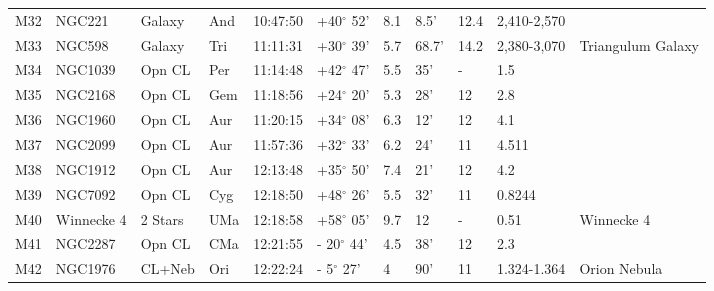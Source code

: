 \documentclass[10pt,twoside,a4paper,english]{article}
\begin{document}
\begin{longtable}{@{}lllllllllll@{}}
M32        & NGC221      & Galaxy     & And       & 10:47:50 & +40$^{\circ}$ 52'  & 8.1       & 8.5'                 & 12.4     & 2,410-2,570         &                                           \\ 
M33        & NGC598      & Galaxy     & Tri       & 11:11:31 & +30$^{\circ}$ 39'  & 5.7       & 68.7'                & 14.2     & 2,380-3,070         & Triangulum Galaxy                         \\ 
M34        & NGC1039     & Opn CL     & Per       & 11:14:48 & +42$^{\circ}$ 47'  & 5.5       & 35'                  & -        & 1.5                 &                                           \\ 
M35        & NGC2168     & Opn CL     & Gem       & 11:18:56 & +24$^{\circ}$ 20'  & 5.3       & 28'                  & 12       & 2.8                 &                                           \\ 
M36        & NGC1960     & Opn CL     & Aur       & 11:20:15 & +34$^{\circ}$ 08'  & 6.3       & 12'                  & 12       & 4.1                 &                                           \\ 
M37        & NGC2099     & Opn CL     & Aur       & 11:57:36 & +32$^{\circ}$ 33'  & 6.2       & 24'                  & 11       & 4.511               &                                           \\ 
M38        & NGC1912     & Opn CL     & Aur       & 12:13:48 & +35$^{\circ}$ 50'  & 7.4       & 21'                  & 12       & 4.2                 &                                           \\ 
M39        & NGC7092     & Opn CL     & Cyg       & 12:18:50 & +48$^{\circ}$ 26'  & 5.5       & 32'                  & 11       & 0.8244              &                                           \\ 
M40        & Winnecke 4  & 2 Stars    & UMa       & 12:18:58 & +58$^{\circ}$ 05'  & 9.7       & 12                   & -        & 0.51                & Winnecke 4                                \\ 
M41        & NGC2287     & Opn CL     & CMa       & 12:21:55 & - 20$^{\circ}$ 44' & 4.5       & 38'                  & 12       & 2.3                 &                                           \\ 
M42        & NGC1976     & CL+Neb     & Ori       & 12:22:24 & - 5$^{\circ}$ 27'  & 4         & 90'                  & 11       & 1.324-1.364         & Orion Nebula                              \\ 

\end{longtable}
\end{document}
